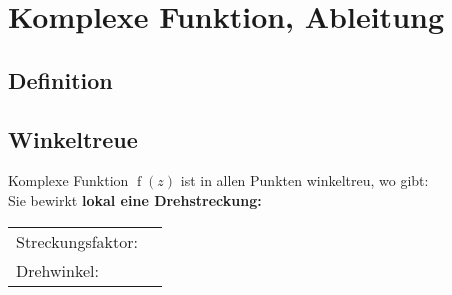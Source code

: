 		\section{Komplexe Funktion, Ableitung}
			\begin{minipage}[t]{0.5\textwidth}
				\subsection{Definition}
					
			\end{minipage}
			\begin{minipage}[t]{0.5\textwidth}
				\subsection{Winkeltreue}
					Komplexe Funktion $\operatorname{f}\left( z \right)$ ist in allen Punkten winkeltreu, wo gibt: \\[6pt]
					Sie bewirkt \textbf{lokal eine Drehstreckung:}\\[3pt]
					\begin{tabular}{ll}
						Streckungsfaktor: & \fbox{$\left|f^{\prime}(z)\right|$}\\[3pt]
						Drehwinkel: & \fbox{$\operatorname{\arg}\left( z \right)$}\\[3pt]
					\end{tabular}
			\end{minipage}
